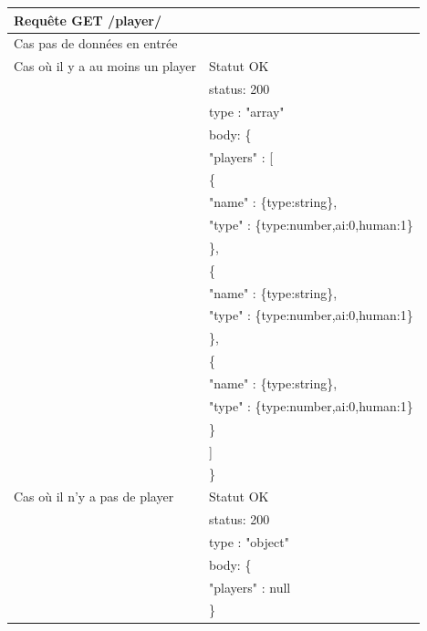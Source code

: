 \documentclass[12pt,a4paper]{article}
\begin{document}
\begin{longtable}{ll}
   Requête GET /player/ &  \\
   \hline
   \hline
   Cas pas de données en entrée &  \\
   \hline
   Cas où il y a au moins un player & Statut OK\\
    & status: 200\\
    & type : "array"\\
    & body: \{ \\
    & \hspace{1cm}"players" : [\\
    &      \hspace{2cm}\{\\
    &          \hspace{3cm}"name" : \{type:string\},\\
    &          \hspace{3cm}"type" : \{type:number,ai:0,human:1\}\\
    &      \hspace{2cm}\},\\
    &      \hspace{2cm}\{\\
    &         \hspace{3cm}"name" : \{type:string\},\\
    &         \hspace{3cm}"type" : \{type:number,ai:0,human:1\}\\
    &      \hspace{2cm}\},\\
    &      \hspace{2cm}\{\\
    &         \hspace{3cm}"name" : \{type:string\},\\
    &         \hspace{3cm}"type" : \{type:number,ai:0,human:1\}\\
    &      \hspace{2cm}\}\\
    &   \hspace{1cm}]\\
    & \}\\
   \hline
    Cas où il n'y a pas de player & Statut OK\\
    & status: 200\\
    & type : "object"\\
    & body: \{ \\
    & \hspace{1cm}"players" : null\\
    & \}\\


\end{longtable}
\end{document}
